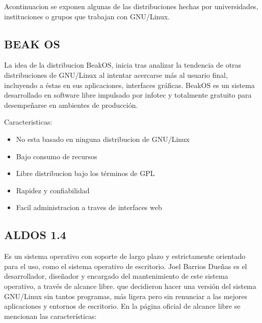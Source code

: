 Acontinuacion se exponen algunas de las distribuciones hechas
por universidades, instituciones o grupos que trabajan con
GNU/Linux.

\subsection*{BEAK OS}
La idea de la distribucion BeakOS, inicia tras analizar la
tendencia de otras distribuciones de GNU/Linux al intentar
acercarse más al usuario final, incluyendo a éstas en sus
aplicaciones, interfaces gráficas. BeakOS es un sistema
desarrollado en software libre impulsado por infotec y
totalmente gratuito para desempeñarse en ambientes de
producción.

Caracteristicas:
\begin{itemize}
  \item No esta basado en ninguna distribucion de GNU/Linux
  \item Bajo consumo de recursos
  \item Libre distribucion bajo los términos de GPL
  \item Rapidez y confiabilidad
  \item Facil administracion a traves de interfaces web
\end{itemize}

\subsection*{ALDOS 1.4}
Es un sistema operativo con soporte de largo plazo y
estrictamente orientado para el uso, como el sistema operativo
de escritorio. Joel Barrios Dueñas es el desarrollador, diseñador
y encargado del mantenimiento de este sistema operativo, a
través de alcance libre. que decidieron hacer una versión del
sistema GNU/Linux sin tantos programas, más ligera pero sin
renunciar a las mejores aplicaciones y entornos de escritorio.
En la página oficial de alcance libre se mencionan las
características:

